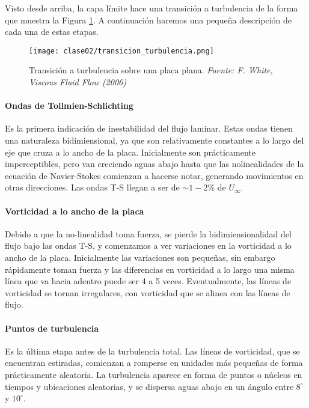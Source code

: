Visto desde arriba, la capa límite hace una transición a turbulencia de la forma que muestra la Figura \ref{fig:transicion_turbulencia}.
A continuación haremos una pequeña descripción de cada una de estas etapas.
%
\begin{figure}[h!]
\centering
\texttt{[image: clase02/transicion\_turbulencia.png]}
\caption{Transición a turbulencia sobre una placa plana. \emph{Fuente: F. White, Viscous Fluid Flow (2006)}}
\label{fig:transicion_turbulencia}
\end{figure}

\paragraph*{Ondas de Tollmien-Schlichting}
Es la primera indicación de inestabilidad del flujo laminar. 
Estas ondas tienen una naturaleza bidimiensional, ya que son relativamente constantes a lo largo del eje que cruza a lo ancho de la placa.
Inicialmente son prácticamente imperceptibles, pero van creciendo aguas abajo hasta que las nolinealidades de la ecuación de Navier-Stokes comienzan a hacerse notar, generando movimientos en otras direcciones.
Las ondas T-S llegan a ser de $\sim 1-2\%$ de $U_\infty$.

\paragraph*{Vorticidad a lo ancho de la placa}
Debido a que la no-linealidad toma fuerza, se pierde la bidimiensionalidad del flujo bajo las ondas T-S, y comenzamos a ver variaciones en la vorticidad a lo ancho de la placa.
Inicialmente las variaciones son pequeñas, sin embargo rápidamente toman fuerza y las diferencias en vorticidad a lo largo una misma línea que va hacia adentro puede ser 4 a 5 veces.
Eventualmente, las líneas de vorticidad se tornan irregulares, con vorticidad que se alinea con las líneas de flujo.

\paragraph*{Puntos de turbulencia}
Es la última etapa antes de la turbulencia total.
Las líneas de vorticidad, que se encuentran estiradas, comienzan a romperse en unidades más pequeñas de forma prácticamente aleatoria. 
La turbulencia aparece en forma de puntos o núcleos en tiempos y ubicaciones aleatorias, y se dispersa aguas abajo en un ángulo entre $8^\circ$ y $10^\circ$.

